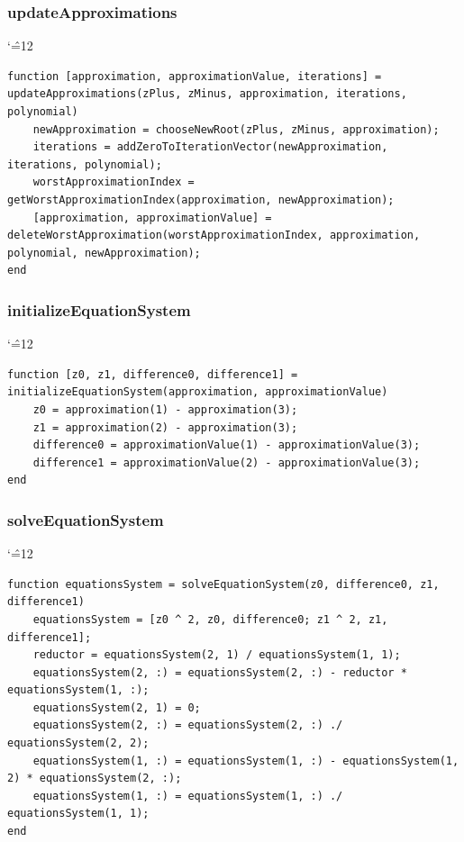 \documentclass[12pt]{report}
\newenvironment{simplechar}{%
   \catcode`\^=12
}{}
\begin{document}
\subsubsection{updateApproximations}
\begin{simplechar}
\begin{lstlisting}
function [approximation, approximationValue, iterations] = updateApproximations(zPlus, zMinus, approximation, iterations, polynomial)
    newApproximation = chooseNewRoot(zPlus, zMinus, approximation);
    iterations = addZeroToIterationVector(newApproximation, iterations, polynomial);
    worstApproximationIndex = getWorstApproximationIndex(approximation, newApproximation);
    [approximation, approximationValue] = deleteWorstApproximation(worstApproximationIndex, approximation, polynomial, newApproximation);
end
\end{lstlisting}
\end{simplechar}

\subsubsection{initializeEquationSystem}
\begin{simplechar}
\begin{lstlisting}
function [z0, z1, difference0, difference1] = initializeEquationSystem(approximation, approximationValue)
    z0 = approximation(1) - approximation(3);
    z1 = approximation(2) - approximation(3);
    difference0 = approximationValue(1) - approximationValue(3);
    difference1 = approximationValue(2) - approximationValue(3);
end
\end{lstlisting}
\end{simplechar}

\subsubsection{solveEquationSystem}
\begin{simplechar}
\begin{lstlisting}
function equationsSystem = solveEquationSystem(z0, difference0, z1, difference1)
    equationsSystem = [z0 ^ 2, z0, difference0; z1 ^ 2, z1, difference1];
    reductor = equationsSystem(2, 1) / equationsSystem(1, 1);
    equationsSystem(2, :) = equationsSystem(2, :) - reductor * equationsSystem(1, :);
    equationsSystem(2, 1) = 0;
    equationsSystem(2, :) = equationsSystem(2, :) ./ equationsSystem(2, 2);
    equationsSystem(1, :) = equationsSystem(1, :) - equationsSystem(1, 2) * equationsSystem(2, :);
    equationsSystem(1, :) = equationsSystem(1, :) ./ equationsSystem(1, 1);
end
\end{lstlisting}
\end{simplechar}
\end{document}
